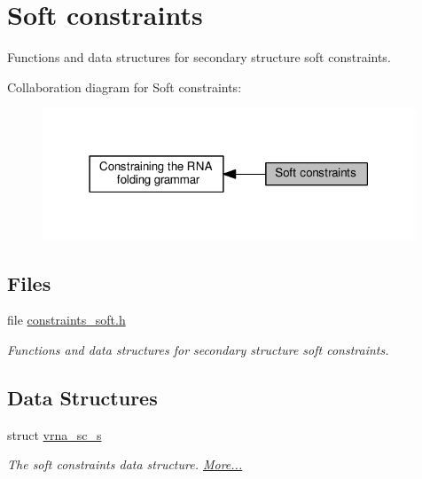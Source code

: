 \hypertarget{group__soft__constraints}{}\section{Soft constraints}
\label{group__soft__constraints}


Functions and data structures for secondary structure soft constraints.  


Collaboration diagram for Soft constraints\+:
\nopagebreak
\begin{figure}[H]
\begin{center}
\leavevmode
\includegraphics[width=315pt]{group__soft__constraints}
\end{center}
\end{figure}
\subsection*{Files}
\begin{DoxyCompactItemize}
\item 
file \hyperlink{constraints__soft_8h}{constraints\+\_\+soft.\+h}
\begin{DoxyCompactList}\small\item\em Functions and data structures for secondary structure soft constraints. \end{DoxyCompactList}\end{DoxyCompactItemize}
\subsection*{Data Structures}
\begin{DoxyCompactItemize}
\item 
struct \hyperlink{group__soft__constraints_structvrna__sc__s}{vrna\+\_\+sc\+\_\+s}
\begin{DoxyCompactList}\small\item\em The soft constraints data structure.  \hyperlink{group__soft__constraints_structvrna__sc__s}{More...}\end{DoxyCompactList}\end{DoxyCompactItemize}
